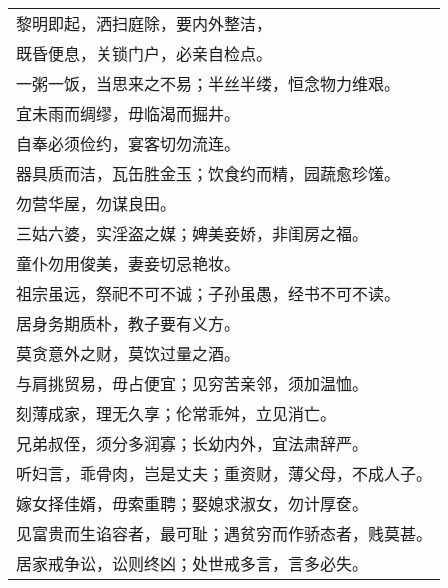 \documentclass[UTF8,titlepage,oneside]{ctexbook}
\begin{document}
\begin{center}
	\begin{tabular}{l}
		
		黎明即起，洒扫庭除，要内外整洁，\\
		
		
		既昏便息，关锁门户，必亲自检点。\\
		
		
		一粥一饭，当思来之不易；半丝半缕，恒念物力维艰。\\
		
		
		宜未雨而绸缪，毋临渴而掘井。\\
		
		
		自奉必须俭约，宴客切勿流连。\\
		
		
		器具质而洁，瓦缶胜金玉；饮食约而精，园蔬愈珍馐。\\
		
		
		勿营华屋，勿谋良田。\\
		
		
		三姑六婆，实淫盗之媒；婢美妾娇，非闺房之福。\\
		
		
		童仆勿用俊美，妻妾切忌艳妆。\\
		
		
		祖宗虽远，祭祀不可不诚；子孙虽愚，经书不可不读。\\
		
		
		居身务期质朴，教子要有义方。\\
		
		
		莫贪意外之财，莫饮过量之酒。\\
		
		
		与肩挑贸易，毋占便宜；见穷苦亲邻，须加温恤。\\
		
		
		刻薄成家，理无久享；伦常乖舛，立见消亡。\\
		
		
		兄弟叔侄，须分多润寡；长幼内外，宜法肃辞严。\\
		
		
		听妇言，乖骨肉，岂是丈夫；重资财，薄父母，不成人子。\\
		
		
		嫁女择佳婿，毋索重聘；娶媳求淑女，勿计厚奁。\\
		
		
		见富贵而生谄容者，最可耻；遇贫穷而作骄态者，贱莫甚。\\
		
		
		居家戒争讼，讼则终凶；处世戒多言，言多必失。\\
		

\end{tabular}
\end{center}
\end{document}
